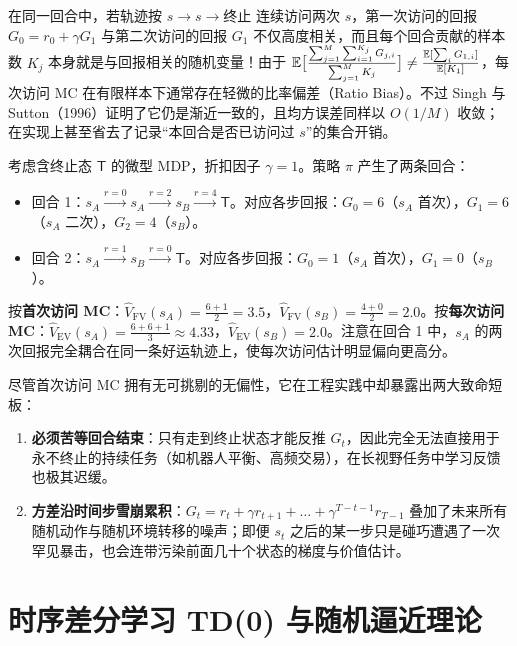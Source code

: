 \begin{remark}
在同一回合中，若轨迹按 $s \to s \to \text{终止}$ 连续访问两次 $s$，第一次访问的回报 $G_0 = r_0 + \gamma G_1$ 与第二次访问的回报 $G_1$ 不仅高度相关，而且每个回合贡献的样本数 $K_j$ 本身就是与回报相关的随机变量！由于 $\mathbb{E}\big[\frac{\sum_{j=1}^M \sum_{i=1}^{K_j} G_{j,i}}{\sum_{j=1}^M K_j}\big] \neq \frac{\mathbb{E}[\sum_i G_{1,i}]}{\mathbb{E}[K_1]}$，每次访问 MC 在有限样本下通常存在轻微的比率偏差（Ratio Bias）。不过 Singh 与 Sutton（1996）证明了它仍是渐近一致的，且均方误差同样以 $O(1/M)$ 收敛；在实现上甚至省去了记录“本回合是否已访问过 $s$”的集合开销。
\end{remark}

\begin{example}
考虑含终止态 $\mathsf{T}$ 的微型 MDP，折扣因子 $\gamma = 1$。策略 $\pi$ 产生了两条回合：
\begin{itemize}
  \item 回合 1：$s_A \xrightarrow{r=0} s_A \xrightarrow{r=2} s_B \xrightarrow{r=4} \mathsf{T}$。对应各步回报：$G_0 = 6$（$s_A$ 首次），$G_1 = 6$（$s_A$ 二次），$G_2 = 4$（$s_B$）。
  \item 回合 2：$s_A \xrightarrow{r=1} s_B \xrightarrow{r=0} \mathsf{T}$。对应各步回报：$G_0 = 1$（$s_A$ 首次），$G_1 = 0$（$s_B$）。
\end{itemize}
按\textbf{首次访问 MC}：$\hat{V}_{\mathrm{FV}}(s_A) = \frac{6 + 1}{2} = 3.5$，$\hat{V}_{\mathrm{FV}}(s_B) = \frac{4 + 0}{2} = 2.0$。按\textbf{每次访问 MC}：$\hat{V}_{\mathrm{EV}}(s_A) = \frac{6 + 6 + 1}{3} \approx 4.33$，$\hat{V}_{\mathrm{EV}}(s_B) = 2.0$。注意在回合 1 中，$s_A$ 的两次回报完全耦合在同一条好运轨迹上，使每次访问估计明显偏向更高分。
\end{example}

尽管首次访问 MC 拥有无可挑剔的无偏性，它在工程实践中却暴露出两大致命短板：
\begin{enumerate}
  \item \textbf{必须苦等回合结束}：只有走到终止状态才能反推 $G_t$，因此完全无法直接用于永不终止的持续任务（如机器人平衡、高频交易），在长视野任务中学习反馈也极其迟缓。
  \item \textbf{方差沿时间步雪崩累积}：$G_t = r_t + \gamma r_{t+1} + \dots + \gamma^{T-t-1} r_{T-1}$ 叠加了未来所有随机动作与随机环境转移的噪声；即便 $s_t$ 之后的某一步只是碰巧遭遇了一次罕见暴击，也会连带污染前面几十个状态的梯度与价值估计。
\end{enumerate}

\section{时序差分学习 TD(0) 与随机逼近理论}
\label{sec:rl-td0}

